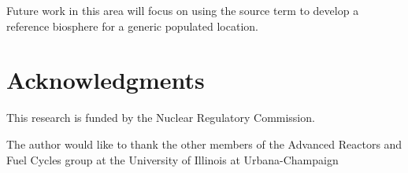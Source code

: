 \documentclass{anstrans}
\begin{document}
Future work in this area will focus on using the source term to develop a reference biosphere for a generic populated location.



\section{Acknowledgments}
This research is funded by the Nuclear Regulatory Commission.

The author would like to thank the other members of the Advanced Reactors and Fuel Cycles group at the University of Illinois at Urbana-Champaign



\end{document}
